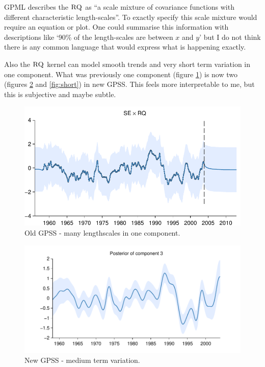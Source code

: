 \documentclass{article}
\begin{document}
GPML describes the ${\textsc{RQ}}$ as ``a scale mixture of \kSE covariance functions with different characteristic length-scales''.
To exactly specify this scale mixture would require an equation or plot.
One could summarise this information with descriptions like `90\% of the length-scales are between $x$ and $y$' but I do not think there is any common language that would express what is happening exactly.

Also the ${\textsc{RQ}}$ kernel can model smooth trends and very short term variation in one component.
What was previously one component (figure \ref{fig:RQ}) is now two (figures \ref{fig:medium} and \ref{fig:short}) in new GPSS.
This feels more interpretable to me, but this is subjective and maybe subtle.

\begin{figure}[h]
\centering
\includegraphics[width=0.98\columnwidth]{figures/old-gpss/03-mauna2003-s_3}
\caption{Old GPSS - many lengthscales in one component.}
\label{fig:RQ}
\end{figure}

\begin{figure}[h]
\centering
\includegraphics[width=0.98\columnwidth]{figures/03-mauna/03-mauna_3}
\caption{New GPSS - medium term variation.}
\label{fig:medium}
\end{figure}
\end{document}
